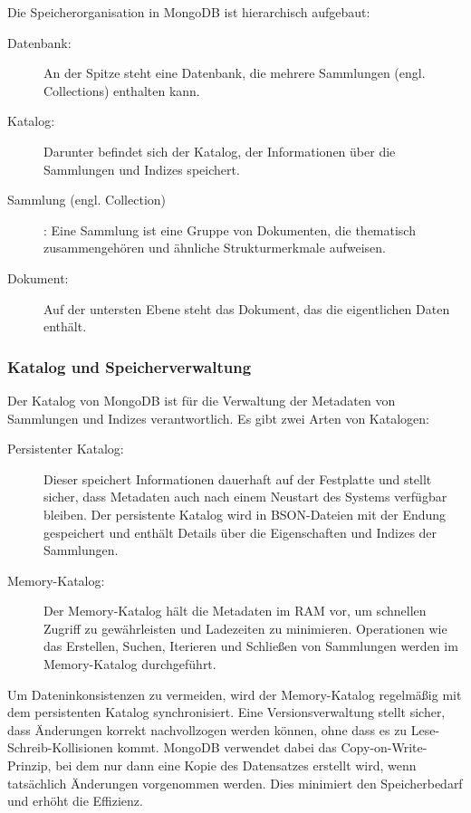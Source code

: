Die Speicherorganisation in MongoDB ist hierarchisch aufgebaut:
\begin{description}
    \item[Datenbank:] An der Spitze steht eine Datenbank, die mehrere Sammlungen (engl. Collections) enthalten kann.
    \item [Katalog:] Darunter befindet sich der Katalog, der Informationen über die Sammlungen und Indizes speichert.
    \item [Sammlung (engl. Collection)]: Eine Sammlung ist eine Gruppe von Dokumenten, die thematisch zusammengehören und ähnliche Strukturmerkmale aufweisen.
    \item [Dokument:] Auf der untersten Ebene steht das Dokument, das die eigentlichen Daten enthält.
\end{description}

\subsubsection{Katalog und Speicherverwaltung}

Der Katalog von MongoDB ist für die Verwaltung der Metadaten von Sammlungen und Indizes verantwortlich. Es gibt zwei Arten von Katalogen:
\begin{description}
    \item[Persistenter Katalog:] Dieser speichert Informationen dauerhaft auf der Festplatte und stellt sicher, dass Metadaten auch nach einem Neustart des Systems verfügbar bleiben. Der persistente Katalog wird in BSON-Dateien mit der Endung  gespeichert und enthält Details über die Eigenschaften und Indizes der Sammlungen.
    \item [Memory-Katalog:] Der Memory-Katalog hält die Metadaten im RAM vor, um schnellen Zugriff zu gewährleisten und Ladezeiten zu minimieren. Operationen wie das Erstellen, Suchen, Iterieren und Schließen von Sammlungen werden im Memory-Katalog durchgeführt.
\end{description}

Um Dateninkonsistenzen zu vermeiden, wird der Memory-Katalog regelmäßig mit dem persistenten Katalog synchronisiert. Eine Versionsverwaltung stellt sicher, dass Änderungen korrekt nachvollzogen werden können, ohne dass es zu Lese-Schreib-Kollisionen kommt. MongoDB verwendet dabei das Copy-on-Write-Prinzip, bei dem nur dann eine Kopie des Datensatzes erstellt wird, wenn tatsächlich Änderungen vorgenommen werden. Dies minimiert den Speicherbedarf und erhöht die Effizienz.

